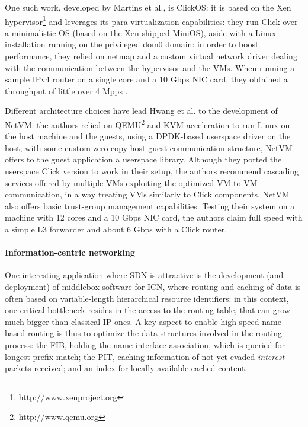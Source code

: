 \documentclass[12pt,a4paper,twoside]{book}
\begin{document}
One such work, developed by Martins et al.\cite{clickos}, is ClickOS: it is based on the Xen hypervisor\footnote{http://www.xenproject.org} and leverages its para-virtualization capabilities: they run Click over a minimalistic OS (based on the Xen-shipped MiniOS), aside with a Linux installation running on the privileged dom0 domain: in order to boost performance, they relied on netmap\cite{netmap} and a custom virtual network driver dealing with the communication between the hypervisor and the VMs. When running a sample IPv4 router on a single core and a 10 Gbps NIC card, they obtained a throughput of little over 4 Mpps .


Different architecture choices have lead Hwang et al. to the development of NetVM\cite{netvm}: the authors relied on QEMU\footnote{http://www.qemu.org} and KVM acceleration to run Linux on the host machine and the guests, using a DPDK-based userspace driver on the host; with some custom zero-copy host-guest communication structure, NetVM offers to the guest application a userspace library. Although they ported the userspace Click version to work in their setup, the authors recommend cascading services offered by multiple VMs exploiting the optimized VM-to-VM communication, in a way treating VMs similarly to Click components. NetVM also offers basic trust-group management capabilities. Testing their system on a machine with 12 cores and a 10 Gbps NIC card, the authors claim full speed with a simple L3 forwarder and about 6 Gbps with a Click router.

\paragraph{Information-centric networking} One interesting application where \gls{SDN} is attractive is the development (and deployment) of middlebox software for \gls{ICN}, where routing and caching of data is often based on variable-length hierarchical resource identifiers: in this context, one critical bottleneck resides in the access to the routing table, that can grow much bigger than classical IP ones.
A key aspect to enable high-speed name-based routing is thus to optimize the data structures involved in the routing process: the \gls{FIB}, holding the name-interface association, which is queried for longest-prefix match; the \gls{PIT}, caching information of not-yet-evaded \emph{interest} packets received; and an index for locally-available cached content.
\end{document}
